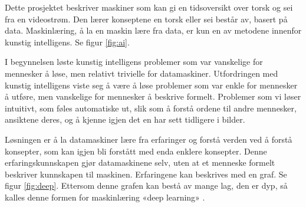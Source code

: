 Dette prosjektet beskriver maskiner som kan gi en tidsoversikt over torsk og sei fra en videostrøm. Den lærer konseptene en torsk eller sei består av, basert på data. Maskinlæring, å la en maskin lære fra data, er kun en av metodene innenfor kunstig intelligens. Se figur \ref{fig:ai}. \cite{Canziani m.fl. 2017 s. 1}

I begynnelsen løste kunstig intelligens problemer som var vanskelige for mennesker å løse, men relativt trivielle for datamaskiner. Utfordringen med kunstig intelligens viste seg å være å løse problemer som var enkle for mennesker å utføre, men vanskelige for mennesker å beskrive formelt. Problemer som vi løser intuitivt, som føles automatiske ut, slik som å forstå ordene til andre mennesker, ansiktene deres, og å kjenne igjen det en har sett tidligere i bilder. \cite{Goodfellow m.fl. 2016 s. 1}

Løsningen er å la datamaskiner lære fra erfaringer og forstå verden ved å forstå konsepter, som kan igjen bli forstått med enda enklere konsepter. Denne erfaringskunnskapen gjør datamaskinene selv, uten at et menneske formelt beskriver kunnskapen til maskinen. Erfaringene kan beskrives med en graf. Se figur \ref{fig:deep}. Ettersom denne grafen kan bestå av mange lag, den er dyp, så kalles denne formen for maskinlæring «deep learning» \cite{Goodfellow m.fl. 2016 s. 1}.



